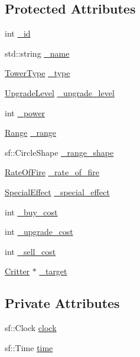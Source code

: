 \subsection*{Protected Attributes}
\begin{DoxyCompactItemize}
\item 
int \hyperlink{class_tower_a02ec2f8d1c4dea2f7fc002d8626c8b28}{\+\_\+id}
\item 
std\+::string \hyperlink{class_tower_ac29247d1ed8c97c105f5f1e05fb1f92c}{\+\_\+name}
\item 
\hyperlink{class_tower_a110a21c18d4ec095c6234bd17f004b3e}{Tower\+Type} \hyperlink{class_tower_adebb7de2d38284d29e3ca6b37c4a2be9}{\+\_\+type}
\item 
\hyperlink{class_tower_a23889cd9ee2fbae0420c97105fd6ebc8}{Upgrade\+Level} \hyperlink{class_tower_a0172731487da6a0480901e031e2aecbe}{\+\_\+upgrade\+\_\+level}
\item 
int \hyperlink{class_tower_af9e223c165f5632944868df3dfc70bee}{\+\_\+power}
\item 
\hyperlink{class_tower_a52bcc3e7f85c01b3105e919717503169}{Range} \hyperlink{class_tower_a71ece6661af3529aaa2da1bf30a53fd5}{\+\_\+range}
\item 
sf\+::\+Circle\+Shape \hyperlink{class_tower_ae1c75d802145f4b64d6a42820557e708}{\+\_\+range\+\_\+shape}
\item 
\hyperlink{class_tower_ae82ae8201f8921eb64878d2c9ecb5bb2}{Rate\+Of\+Fire} \hyperlink{class_tower_a746898a9884a60cf09c5b4d0f1fdac2a}{\+\_\+rate\+\_\+of\+\_\+fire}
\item 
\hyperlink{class_tower_a355ab1cbcfd8c4d037ccf8937f784445}{Special\+Effect} \hyperlink{class_tower_ad6a84071c2e7f48386443c469961116c}{\+\_\+special\+\_\+effect}
\item 
int \hyperlink{class_tower_a102680a58c45f98a79609ce8961a7bed}{\+\_\+buy\+\_\+cost}
\item 
int \hyperlink{class_tower_ade771f89ab1aecb165efb74592e71261}{\+\_\+upgrade\+\_\+cost}
\item 
int \hyperlink{class_tower_a7f50414500ec524ccc6ffb7069328d1e}{\+\_\+sell\+\_\+cost}
\item 
\hyperlink{class_critter}{Critter} $\ast$ \hyperlink{class_tower_a8ce9a2da58e6b3563ffddf1ff70826e4}{\+\_\+target}
\end{DoxyCompactItemize}
\subsection*{Private Attributes}
\begin{DoxyCompactItemize}
\item 
sf\+::\+Clock \hyperlink{class_tower_a3b6e91ecba4f6dadb4e5ed3514f970e9}{clock}
\item 
sf\+::\+Time \hyperlink{class_tower_a2536099ae99cd22eef6d84259dab5ed7}{time}
\end{DoxyCompactItemize}


